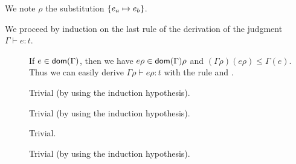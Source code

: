 \documentclass[a4paper]{article}
\theoremstyle{definition}
\begin{document}
        We note $\rho$ the substitution $\{e_a \mapsto e_b\}$.

        We proceed by induction on the last rule of the derivation of the judgment $\Gamma \vdash e : t$.

        \begin{description}
          \item[] If $e\in\textsf{dom}(\Gamma)$, then we have $e\rho\in\textsf{dom}(\Gamma)\rho$ and $(\Gamma\rho)(e\rho)\leq\Gamma(e)$.
          Thus we can easily derive $\Gamma\rho\vdash e\rho:t$ with the rule  and .
          \item[] Trivial (by using the induction hypothesis).
          \item[] Trivial (by using the induction hypothesis).
          \item[] Trivial.
          \item[] Trivial (by using the induction hypothesis).
        \end{description}
\end{document}
